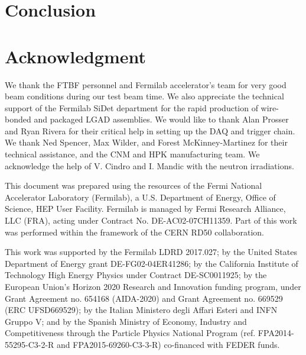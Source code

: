 \documentclass[preprint,1p]{elsarticle}
\begin{document}
 
\section{Conclusion}
\label{sec:conclusion} 


\section*{Acknowledgment}

We thank the FTBF personnel and Fermilab accelerator's team for very good beam
conditions during our test beam time. We also appreciate the technical support
of the Fermilab SiDet department for the rapid production of wire-bonded and
packaged LGAD assemblies. We would like to thank Alan Prosser and Ryan Rivera
for their critical help in setting up the DAQ and trigger chain. We thank Ned
Spencer, Max Wilder, and Forest McKinney-Martinez for their technical
assistance, and the CNM and HPK manufacturing team. We acknowledge the help of
V. Cindro and I. Mandic with the neutron irradiations. 

This document was prepared using the resources of the Fermi National Accelerator
Laboratory (Fermilab), a U.S. Department of Energy, Office of Science, HEP User
Facility. Fermilab is managed by Fermi Research Alliance, LLC (FRA), acting
under Contract No. DE-AC02-07CH11359. Part of this work was performed within the
framework of the CERN RD50 collaboration.

This work was supported by the Fermilab LDRD 2017.027; by the United States
Department of Energy grant DE-FG02-04ER41286; by the California Institute of
Technology High Energy Physics under Contract DE-SC0011925; by the European
Union's Horizon 2020 Research and Innovation funding program, under Grant
Agreement no. 654168 (AIDA-2020) and Grant Agreement no. 669529 (ERC
UFSD669529); by the Italian Ministero degli Affari Esteri and INFN Gruppo V; and
by the Spanish Ministry of Economy, Industry and Competitiveness through the
Particle Physics National Program (ref. FPA2014-55295-C3-2-R and
FPA2015-69260-C3-3-R) co-financed with FEDER funds.



\end{document}
